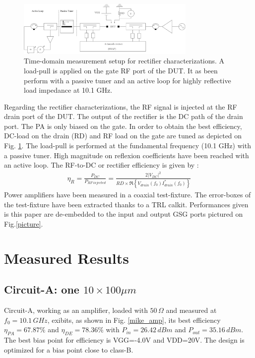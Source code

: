 \documentclass[conference]{IEEEtran}
\begin{document}
\begin{figure}[ht!] %
\centering
\includegraphics[width=3.4in]{IMS2014_bench.pdf}
\caption{ Time-domain measurement setup for rectifier characterizations. A load-pull is applied on the gate RF port of the DUT. It as been perform with a passive tuner and an active loop for highly reflective load impedance at 10.1 GHz.}
\label{bench}
\end{figure}

Regarding the rectifier characterizations, the RF signal is injected at the RF drain port of the DUT. The output of the rectifier is the DC path of the drain port. The PA is only biased on the gate. In order to obtain the best efficiency, DC-load on the drain (RD) and RF load on the gate are tuned as depicted on Fig. \ref{bench}. The load-pull is performed at the fundamental frequency (10.1 GHz) with a passive tuner. High magnitude on reflexion coefficients have been reached with an active loop.
The RF-to-DC or rectifier efficiency is given by :
\begin{eqnarray}
\eta_{R}=\frac{P_{DC}}{P_{RF\,injected}}=\frac{2{\left|V_{DC}\right|}^2}{RD \times \Re{\left\{V_{drain}\left(f_0\right)I^{*}_{drain}\left(f_0\right)\right\}}}
\end{eqnarray}
Power amplifiers have been measured in a coaxial test-fixture. The error-boxes of the test-fixture have been extracted thanks to a TRL calkit. Performances given is this paper are de-embedded to the input and output GSG ports pictured on Fig.\;\ref{picture}.



\section{Measured Results}

\subsection{Circuit-A: one $10\times100\mu m$}
Circuit-A, working as an amplifier, loaded with $50\,\Omega$ and measured at $f_0=10.1\,GHz$, exibits, as shown in Fig. \ref{mike_amp}, its best efficiency $\eta_{PA}=67.87\%$ and $\eta_{DE}=78.36\%$ with $P_{in}=26.42\,dBm$ and  $P_{out}=35.16\,dBm$. The best bias point for efficiency is VGG=-4.0V and VDD=20V. The design is optimized for a bias point close to class-B.
\end{document}

